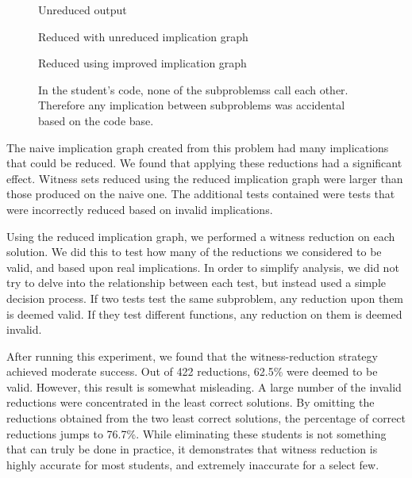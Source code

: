 \documentclass[11pt,twoside]{article}
\begin{document}
\begin{figure}

\caption{Unreduced output}

\caption{Reduced with unreduced implication graph}

\caption{Reduced using improved implication graph}
\caption{In the student's code, none of the subproblemss call each other. Therefore any implication between subproblems was accidental based on the code base.}
\end{figure}

The naive implication graph created from this problem had many implications that could be reduced. We found that applying these reductions had a significant effect. Witness sets reduced using the reduced implication graph were larger than those produced on the naive one. The additional tests contained were tests that were incorrectly reduced based on invalid implications.

Using the reduced implication graph, we performed a witness reduction on each solution. We did this to test how many of the reductions we considered to be valid, and based upon real implications. In order to simplify analysis, we did not try to delve into the relationship between each test, but instead used a simple decision process. If two tests test the same subproblem, any reduction upon them is deemed valid. If they test different functions, any reduction on them is deemed invalid.



After running this experiment, we found that the witness-reduction strategy achieved moderate success. Out of 422 reductions, 62.5\% were deemed to be valid. However, this result is somewhat misleading. A large number of the invalid reductions were concentrated in the least correct solutions. By omitting the reductions obtained from the two least correct solutions, the percentage of correct reductions jumps to 76.7\%. While eliminating these students is not something that can truly be done in practice, it demonstrates that witness reduction is highly accurate for most students, and extremely inaccurate for a select few.
\end{document}
